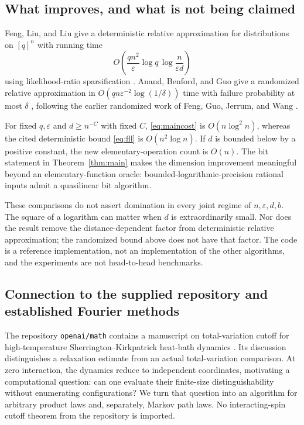 \documentclass[11pt]{article}
\theoremstyle{definition}
\theoremstyle{remark}
\newcommand{\eps}{\varepsilon}
\begin{document}
\subsection{What improves, and what is not being claimed}

Feng, Liu, and Liu give a deterministic relative approximation for distributions on $[q]^n$ with running time
\begin{equation}
 O\!\left(\frac{qn^2}{\eps}\log q\,
       \log\frac{n}{\eps d}\right)
 \label{eq:fll}
\end{equation}
using likelihood-ratio sparsification \cite{FLL24}. Anand, Benford, and Guo give a randomized relative approximation in $O(qn\eps^{-2}\log(1/\delta))$ time with failure probability at most $\delta$ \cite{ABG26}, following the earlier randomized work of Feng, Guo, Jerrum, and Wang \cite{FGJW23}.

For fixed $q,\eps$ and $d\ge n^{-C}$ with fixed $C$, \eqref{eq:maincost} is $O(n\log^2 n)$, whereas the cited deterministic bound \eqref{eq:fll} is $O(n^2\log n)$. If $d$ is bounded below by a positive constant, the new elementary-operation count is $O(n)$. The bit statement in Theorem~\ref{thm:main} makes the dimension improvement meaningful beyond an elementary-function oracle: bounded-logarithmic-precision rational inputs admit a quasilinear bit algorithm.

These comparisons do not assert domination in every joint regime of $n,\eps,d,b$. The square of a logarithm can matter when $d$ is extraordinarily small. Nor does the result remove the distance-dependent factor from deterministic relative approximation; the randomized bound above does not have that factor. The code is a reference implementation, not an implementation of the other algorithms, and the experiments are not head-to-head benchmarks.

\subsection{Connection to the supplied repository and established Fourier methods}

The repository \texttt{openai/math} contains a manuscript on total-variation cutoff for high-temperature Sherrington--Kirkpatrick heat-bath dynamics \cite{OpenAISk26}. Its discussion distinguishes a relaxation estimate from an actual total-variation comparison. At zero interaction, the dynamics reduce to independent coordinates, motivating a computational question: can one evaluate their finite-size distinguishability without enumerating configurations? We turn that question into an algorithm for arbitrary product laws and, separately, Markov path laws. No interacting-spin cutoff theorem from the repository is imported.
\end{document}
